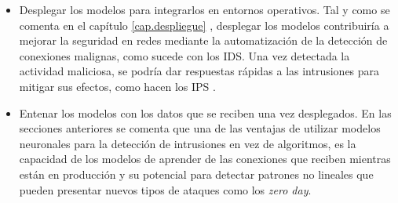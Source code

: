 \begin{itemize}
	\item Desplegar los modelos para integrarlos en entornos operativos. Tal y como se comenta en el capítulo \ref{cap.despliegue} , desplegar los modelos contribuiría a mejorar la seguridad en redes mediante la automatización de la detección de conexiones malignas, como sucede con los IDS. Una vez detectada la actividad maliciosa, se podría dar respuestas rápidas a las intrusiones para mitigar sus efectos, como hacen los IPS
	. 
	\item Entenar los modelos con los datos que se reciben una vez desplegados. En las secciones anteriores se comenta que una de las ventajas de utilizar modelos neuronales para la detección de intrusiones en vez de algoritmos, es la capacidad de los modelos de aprender de las conexiones que reciben mientras están en producción y su potencial para detectar patrones no lineales que pueden presentar nuevos tipos de ataques como los \textit{zero day}.
\end{itemize}


